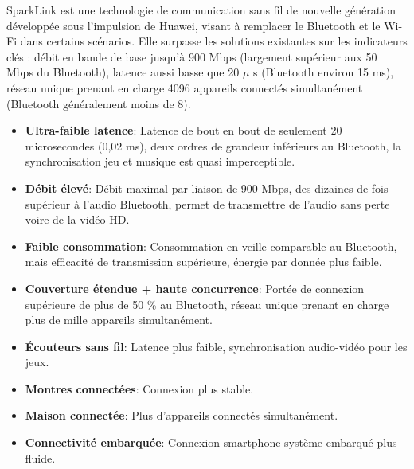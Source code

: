 
SparkLink est une technologie de communication sans fil de nouvelle génération développée sous l'impulsion de Huawei, visant à remplacer le Bluetooth et le Wi-Fi dans certains scénarios. Elle surpasse les solutions existantes sur les indicateurs clés : débit en bande de base jusqu'à 900 Mbps (largement supérieur aux 50 Mbps du Bluetooth), latence aussi basse que 20 $\mu$ s (Bluetooth environ 15 ms), réseau unique prenant en charge 4096 appareils connectés simultanément (Bluetooth généralement moins de 8).


\begin{itemize}
  \item \textbf{Ultra-faible latence}: Latence de bout en bout de seulement 20 microsecondes (0,02 ms), deux ordres de grandeur inférieurs au Bluetooth, la synchronisation jeu et musique est quasi imperceptible.
  \item \textbf{Débit élevé}: Débit maximal par liaison de 900 Mbps, des dizaines de fois supérieur à l'audio Bluetooth, permet de transmettre de l'audio sans perte voire de la vidéo HD.
  \item \textbf{Faible consommation}: Consommation en veille comparable au Bluetooth, mais efficacité de transmission supérieure, énergie par donnée plus faible.
  \item \textbf{Couverture étendue + haute concurrence}: Portée de connexion supérieure de plus de 50 \% au Bluetooth, réseau unique prenant en charge plus de mille appareils simultanément.
\end{itemize}


\begin{itemize}
  \item \textbf{Écouteurs sans fil}: Latence plus faible, synchronisation audio-vidéo pour les jeux.
  \item \textbf{Montres connectées}: Connexion plus stable.
  \item \textbf{Maison connectée}: Plus d'appareils connectés simultanément.
  \item \textbf{Connectivité embarquée}: Connexion smartphone-système embarqué plus fluide.
\end{itemize}



